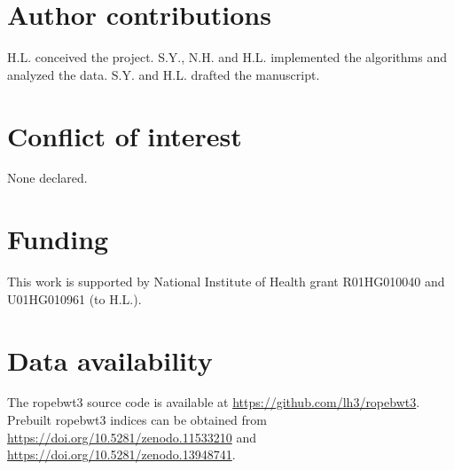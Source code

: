 \documentclass[webpdf,contemporary,large,namedate]{oup-authoring-template}%
\begin{document}
\section*{Author contributions}

H.L. conceived the project.
S.Y., N.H. and H.L. implemented the algorithms and analyzed the data.
S.Y. and H.L. drafted the manuscript.

\section*{Conflict of interest}

None declared.

\section*{Funding}

This work is supported by National Institute of Health grant R01HG010040 and U01HG010961 (to H.L.).

\section*{Data availability}

The ropebwt3 source code is available at \url{https://github.com/lh3/ropebwt3}.
Prebuilt ropebwt3 indices can be obtained from \url{https://doi.org/10.5281/zenodo.11533210}
and \url{https://doi.org/10.5281/zenodo.13948741}.


{\sffamily\small
}
\end{document}
